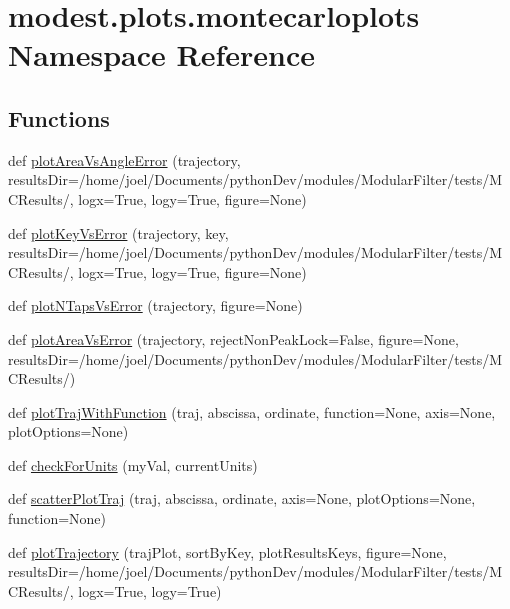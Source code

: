 \hypertarget{namespacemodest_1_1plots_1_1montecarloplots}{}\section{modest.\+plots.\+montecarloplots Namespace Reference}
\label{namespacemodest_1_1plots_1_1montecarloplots}
\subsection*{Functions}
\begin{DoxyCompactItemize}
\item 
def \hyperlink{namespacemodest_1_1plots_1_1montecarloplots_af403c96348cb2de154c8e07a1204703d}{plot\+Area\+Vs\+Angle\+Error} (trajectory, results\+Dir=\textquotesingle{}/home/joel/Documents/python\+Dev/modules/Modular\+Filter/tests/M\+C\+Results/\textquotesingle{}, logx=True, logy=True, figure=None)
\item 
def \hyperlink{namespacemodest_1_1plots_1_1montecarloplots_a55759f5a4200bdb71989294f66c44846}{plot\+Key\+Vs\+Error} (trajectory, key, results\+Dir=\textquotesingle{}/home/joel/Documents/python\+Dev/modules/Modular\+Filter/tests/M\+C\+Results/\textquotesingle{}, logx=True, logy=True, figure=None)
\item 
def \hyperlink{namespacemodest_1_1plots_1_1montecarloplots_a7799195366030d9eeffd4e37364277ab}{plot\+N\+Taps\+Vs\+Error} (trajectory, figure=None)
\item 
def \hyperlink{namespacemodest_1_1plots_1_1montecarloplots_a0b6aa0342e77a3e4b744cf028436c90e}{plot\+Area\+Vs\+Error} (trajectory, reject\+Non\+Peak\+Lock=False, figure=None, results\+Dir=\textquotesingle{}/home/joel/Documents/python\+Dev/modules/Modular\+Filter/tests/M\+C\+Results/\textquotesingle{})
\item 
def \hyperlink{namespacemodest_1_1plots_1_1montecarloplots_aaa77ac260d1d31bfb2ccb973089be73c}{plot\+Traj\+With\+Function} (traj, abscissa, ordinate, function=None, axis=None, plot\+Options=None)
\item 
def \hyperlink{namespacemodest_1_1plots_1_1montecarloplots_a23243ef9b5028dd887379c0484c39add}{check\+For\+Units} (my\+Val, current\+Units)
\item 
def \hyperlink{namespacemodest_1_1plots_1_1montecarloplots_a6e47f1be3da01d444aa248651bb8d610}{scatter\+Plot\+Traj} (traj, abscissa, ordinate, axis=None, plot\+Options=None, function=None)
\item 
def \hyperlink{namespacemodest_1_1plots_1_1montecarloplots_ad8bccdc8d922a7e0700f15017af56075}{plot\+Trajectory} (traj\+Plot, sort\+By\+Key, plot\+Results\+Keys, figure=None, results\+Dir=\textquotesingle{}/home/joel/Documents/python\+Dev/modules/Modular\+Filter/tests/M\+C\+Results/\textquotesingle{}, logx=True, logy=True)
\end{DoxyCompactItemize}


